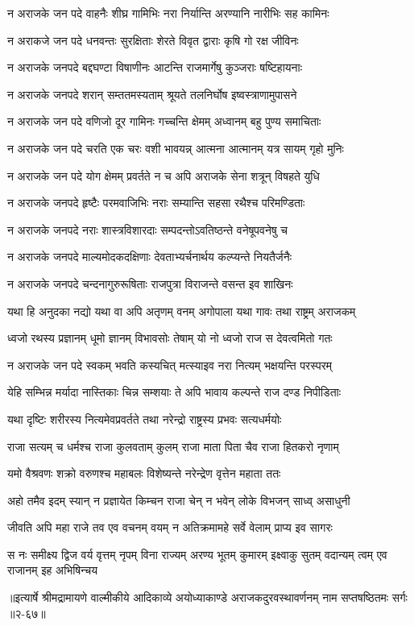 \twolineshloka
{न अराजके जन पदे वाहनैः शीघ्र गामिभिः}
{नरा निर्यान्ति अरण्यानि नारीभिः सह कामिनः} %

\twolineshloka
{न अराकजे जन पदे धनवन्तः सुरक्षिताः}
{शेरते विवृत द्वाराः कृषि गो रक्ष जीविनः} %

\twolineshloka
{न अराजके जनपदे बद्दघण्टा विषाणीनः}
{आटन्ति राजमार्गेषु कुञ्जराः षष्टिहायनाः} %

\twolineshloka
{न अराजके जनपदे शरान् सम्ततमस्यताम्}
{श्रूयते तलनिर्घोष इष्वस्त्राणामुपासने} %

\twolineshloka
{न अराजके जन पदे वणिजो दूर गामिनः}
{गच्चन्ति क्षेमम् अध्वानम् बहु पुण्य समाचिताः} %

\twolineshloka
{न अराजके जन पदे चरति एक चरः वशी}
{भावयन्न् आत्मना आत्मानम् यत्र सायम् गृहो मुनिः} %

\twolineshloka
{न अराजके जन पदे योग क्षेमम् प्रवर्तते}
{न च अपि अराजके सेना शत्रून् विषहते युधि} %

\twolineshloka
{न अराजके जनपदे हृष्टैः परमवाजिभिः}
{नराः सम्यान्ति सहसा रथैश्च परिमण्डिताः} %

\twolineshloka
{न अराजके जनपदे नराः शास्त्रविशारदाः}
{सम्पदन्तोऽवतिष्ठन्ते वनेषूपवनेषु च} %

\twolineshloka
{न अराजके जनपदे माल्यमोदकदक्षिणाः}
{देवताभ्यर्चनार्थय कल्प्यन्ते नियतैर्जनैः} %

\twolineshloka
{न अराजके जनपदे चन्दनागुरुरूषिताः}
{राजपुत्रा विराजन्ते वसन्त इव शाखिनः} %

\twolineshloka
{यथा हि अनुदका नद्यो यथा वा अपि अतृणम् वनम्}
{अगोपाला यथा गावः तथा राष्ट्रम् अराजकम्} %

\twolineshloka
{ध्वजो रथस्य प्रज्ञानम् धूमो ज्ञानम् विभावसोः}
{तेषाम् यो नो ध्वजो राज स देवत्वमितो गतः} %

\twolineshloka
{न अराजके जन पदे स्वकम् भवति कस्यचित्}
{मत्स्याइव नरा नित्यम् भक्षयन्ति परस्परम्} %

\twolineshloka
{येहि सम्भिन्न मर्यादा नास्तिकाः चिन्न सम्शयाः}
{ते अपि भावाय कल्पन्ते राज दण्ड निपीडिताः} %

\twolineshloka
{यथा दृष्टिः शरीरस्य नित्यमेवप्रवर्तते}
{तथा नरेन्द्रो राष्ट्रस्य प्रभवः सत्यधर्मयोः} %

\twolineshloka
{राजा सत्यम् च धर्मश्च राजा कुलवताम् कुलम्}
{राजा माता पिता चैव राजा हितकरो नृणाम्} %

\twolineshloka
{यमो वैश्रवणः शक्रो वरुणश्च महाबलः}
{विशेष्यन्ते नरेन्द्रेण वृत्तेन महाता ततः} %

\twolineshloka
{अहो तमैव इदम् स्यान् न प्रज्ञायेत किम्चन}
{राजा चेन् न भवेन् लोके विभजन् साध्व् असाधुनी} %

\twolineshloka
{जीवति अपि महा राजे तव एव वचनम् वयम्}
{न अतिक्रमामहे सर्वे वेलाम् प्राप्य इव सागरः} %

\fourlineindentedshloka
{स नः समीक्ष्य द्विज वर्य वृत्तम्}
{नृपम् विना राज्यम् अरण्य भूतम्}
{कुमारम् इक्ष्वाकु सुतम् वदान्यम्}
{त्वम् एव राजानम् इह अभिषिन्चय} %


॥इत्यार्षे श्रीमद्रामायणे वाल्मीकीये आदिकाव्ये अयोध्याकाण्डे अराजकदुरवस्थावर्णनम् नाम सप्तषष्ठितमः सर्गः ॥२-६७॥
